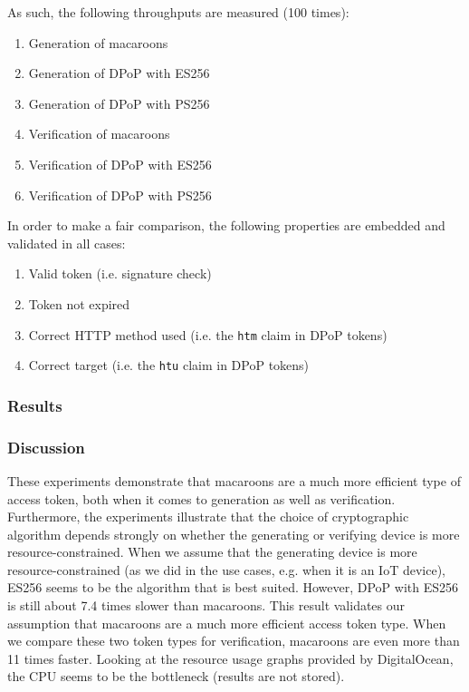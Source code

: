As such, the following throughputs are measured (100 times):
\begin{multicols}{2}
\begin{enumerate}
    \item Generation of macaroons
    \item Generation of \gls{DPoP} with ES256
    \item Generation of \gls{DPoP} with PS256
    \item Verification of macaroons
    \item Verification of \gls{DPoP} with ES256
    \item Verification of \gls{DPoP} with PS256
\end{enumerate}
\end{multicols}

\noindent In order to make a fair comparison, the following properties are embedded and validated in all cases:
\begin{enumerate}
    \item Valid token (i.e. signature check)
    \item Token not expired
    \item Correct HTTP method used (i.e. the \texttt{htm} claim in \gls{DPoP} tokens)
    \item Correct target (i.e. the \texttt{htu} claim in \gls{DPoP} tokens)
\end{enumerate}

\subsubsection{Results}



\subsubsection{Discussion}
These experiments demonstrate that macaroons are a much more efficient type of access token, both when it comes to generation as well as verification. Furthermore, the experiments illustrate that the choice of cryptographic algorithm depends strongly on whether the generating or verifying device is more resource-constrained. When we assume that the generating device is more resource-constrained (as we did in the use cases, e.g. when it is an IoT device), ES256 seems to be the algorithm that is best suited. However, \gls{DPoP} with ES256 is still about 7.4 times slower than macaroons. This result validates our assumption that macaroons are a much more efficient access token type. When we compare these two token types for verification, macaroons are even more than 11 times faster. Looking at the resource usage graphs provided by DigitalOcean, the CPU seems to be the bottleneck (results are not stored).

